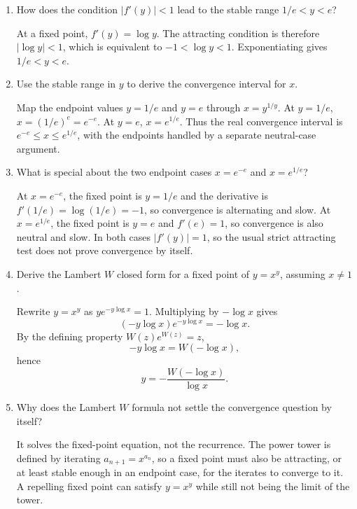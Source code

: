 \documentclass{essay}
\begin{document}
\begin{enumerate}
  \item How does the condition \(|f'(y)|<1\) lead to the stable range
    \(1/e<y<e\)?
    \begin{answer}
      At a fixed point, \(f'(y)=\log y\). The attracting condition is therefore
      \(|\log y|<1\), which is equivalent to
      \(-1<\log y<1\). Exponentiating gives \(1/e<y<e\).
    \end{answer}

  \item Use the stable range in \(y\) to derive the convergence interval for
    \(x\).
    \begin{answer}
      Map the endpoint values \(y=1/e\) and \(y=e\) through
      \(x=y^{1/y}\). At \(y=1/e\), \(x=(1/e)^e=e^{-e}\). At \(y=e\),
      \(x=e^{1/e}\). Thus the real convergence interval is
      \(e^{-e}\le x\le e^{1/e}\), with the endpoints handled by a separate
      neutral-case argument.
    \end{answer}

  \item What is special about the two endpoint cases \(x=e^{-e}\) and
    \(x=e^{1/e}\)?
    \begin{answer}
      At \(x=e^{-e}\), the fixed point is \(y=1/e\) and the derivative is
      \(f'(1/e)=\log(1/e)=-1\), so convergence is alternating and slow. At
      \(x=e^{1/e}\), the fixed point is \(y=e\) and \(f'(e)=1\), so
      convergence is also neutral and slow. In both cases \(|f'(y)|=1\), so
      the usual strict attracting test does not prove convergence by itself.
    \end{answer}

  \item Derive the Lambert \(W\) closed form for a fixed point of
    \(y=x^y\), assuming \(x\ne1\).
    \begin{answer}
      Rewrite \(y=x^y\) as \(y e^{-y\log x}=1\). Multiplying by
      \(-\log x\) gives
      \[
        (-y\log x)e^{-y\log x}=-\log x.
      \]
      By the defining property \(W(z)e^{W(z)}=z\),
      \[
        -y\log x=W(-\log x),
      \]
      hence
      \[
        y=-\frac{W(-\log x)}{\log x}.
      \]
    \end{answer}

  \item Why does the Lambert \(W\) formula not settle the convergence question
    by itself?
    \begin{answer}
      It solves the fixed-point equation, not the recurrence. The power tower
      is defined by iterating \(a_{n+1}=x^{a_n}\), so a fixed point must also
      be attracting, or at least stable enough in an endpoint case, for the
      iterates to converge to it. A repelling fixed point can satisfy
      \(y=x^y\) while still not being the limit of the tower.
    \end{answer}


\end{enumerate}
\end{document}
